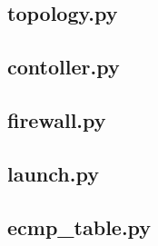 \subsection{topology.py}
	
\subsection{contoller.py}	
	
\subsection{firewall.py}
	
\subsection{launch.py}
	
\subsection{ecmp\_table.py}
	

